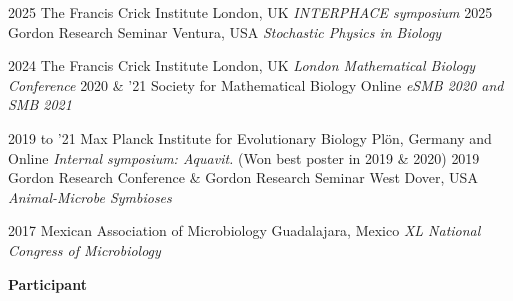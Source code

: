 \documentclass[]{friggeri-cv} %
\begin{document}
\begin{entrylist}
\entry
{2025}
{}
{The Francis Crick Institute}
{London, UK}
{\emph{INTERPHACE symposium}}
{\vspace{-3mm}}
\entry
{2025}
{}
{Gordon Research Seminar}
{Ventura, USA}
{\emph{Stochastic Physics in Biology}}
{\vspace{-3mm}}
\end{entrylist}
\begin{entrylist}
\entry
{2024}
{}
{The Francis Crick Institute}
{London, UK}
{\emph{London Mathematical Biology Conference}}
{\vspace{-3mm}}
\entry
{2020 \& '21}
{}%
{Society for Mathematical Biology}
{Online}
{\emph{eSMB 2020 and SMB 2021}}
{\vspace{-3mm}}
\end{entrylist}
\begin{entrylist}
\entry
{2019 to '21}
{}%
{Max Planck Institute for Evolutionary Biology}
{Plön, Germany and Online}
{\emph{Internal symposium: Aquavit.} (Won best poster in 2019 \& 2020)}
{\vspace{-3mm}}
\entry
{2019}
{}%
{Gordon Research Conference \& Gordon Research Seminar}
{West Dover, USA}
{\emph{Animal-Microbe Symbioses}}
{\vspace{-3mm}}
\end{entrylist}
\begin{entrylist}
\entry
{2017}
{}%
{Mexican Association of Microbiology}
{Guadalajara, Mexico}
{\emph{XL National Congress of Microbiology}}
{\vspace{-3mm}}
\end{entrylist}

\textbf{Participant}
\end{document}
